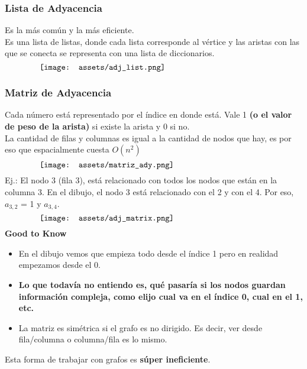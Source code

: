 \documentclass[10pt,a4paper]{article}
\begin{document}
\subsubsection*{Lista de Adyacencia}
Es la más común y la más eficiente. \\
Es una lista de listas, donde cada lista corresponde al vértice y las aristas con las que se conecta se representa con una lista de diccionarios. 
\[\begin{minipage}[b]{0.8\textwidth}
    \texttt{[image: assets/adj\_list.png]}
\end{minipage}\]
\subsubsection*{Matriz de Adyacencia}
Cada número está representado por el índice en donde está. Vale 1 \textbf{(o el valor de peso de la arista)} si existe la arista y 0 si no. \\
La cantidad de filas y columnas es igual a la cantidad de nodos que hay, es por eso que espacialmente cuesta $O(n^{2})$
\[\begin{minipage}[b]{0.8\textwidth}
    \texttt{[image: assets/matriz\_ady.png]}
\end{minipage}\]
Ej.: El nodo 3 (fila 3), está relacionado con todos los nodos que están en la columna 3. En el dibujo, el nodo 3 está relacionado con el 2 y con el 4. Por eso, $a_{3, 2}$ = 1 y $a_{3, 4}$. 
\[\begin{minipage}[b]{0.8\textwidth}
    \texttt{[image: assets/adj\_matrix.png]}
\end{minipage}\]
\textbf{Good to Know}
\begin{itemize}
    \item En el dibujo vemos que empieza todo desde el índice 1 pero en realidad empezamos desde el 0. 
    \item \textbf{Lo que todavía no entiendo es, qué pasaría si los nodos guardan información compleja, como elijo cual va en el índice 0, cual en el 1, etc.} 
    \item La matriz es simétrica si el grafo es no dirigido. Es decir, ver desde fila/columna o columna/fila es lo mismo. 
\end{itemize}
Esta forma de trabajar con grafos es \textbf{súper ineficiente}. 
\end{document}
